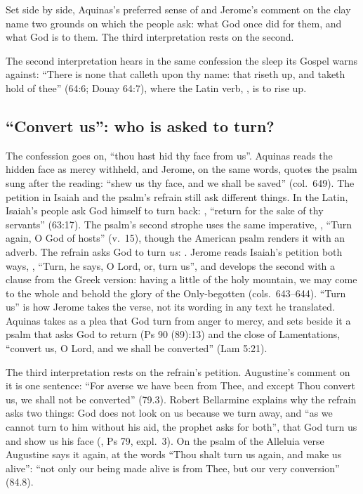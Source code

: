Set side by side, Aquinas's preferred sense of  and
Jerome's comment on the clay name two grounds on which the people ask: what
God once did for them, and what God is to them. The third interpretation rests
on the second.

The second interpretation hears in the same confession the sleep its Gospel
warns against: ``There is none that calleth upon thy name: that riseth up, and
taketh hold of thee'' (64:6; Douay 64:7), where the Latin verb,
, is to rise up.

\subsection{``Convert us'': who is asked to turn?}

The confession goes on, ``thou hast hid thy face from us''. Aquinas reads the
hidden face as mercy withheld, and Jerome, on the same words, quotes the psalm
sung after the reading: ``shew us thy face, and we shall be saved''
(col.~649). The petition in Isaiah and the psalm's refrain still ask different
things. In the
Latin, Isaiah's people ask God himself to turn back: , ``return for the sake of thy servants'' (63:17). The psalm's
second strophe uses the same imperative, ,
``Turn again, O God of hosts'' (v.~15), though the American psalm renders it
with an adverb. The refrain asks God to turn \emph{us}: .
Jerome reads Isaiah's petition both ways, , ``Turn, he says, O Lord, or, turn us'', and develops the second
with a clause from the Greek version: having a little of the holy mountain, we
may come to the whole and behold the glory of the Only-begotten
(cols.~643--644). ``Turn us'' is how Jerome takes the verse, not its wording
in any text he translated. Aquinas takes  as a plea that God
turn from anger to mercy, and sets beside it a psalm that asks God to return
(Ps 90 (89):13) and the close of Lamentations, ``convert us, O Lord, and we
shall be converted'' (Lam 5:21).

The third interpretation rests on the refrain's petition. Augustine's
comment on it is one sentence: ``For averse we have been from Thee, and except
Thou convert us, we shall not be converted'' (79.3). Robert Bellarmine
explains why the refrain asks two things: God does not look on us because we
turn away, and ``as we cannot turn to him without his aid, the prophet asks
for both'', that God turn us and show us his face (, Ps 79, expl.~3). On the psalm of the Alleluia verse Augustine
says it again, at the words ``Thou shalt turn us again, and make us alive'':
``not only our being made alive is from Thee, but our very conversion''
(84.8).

